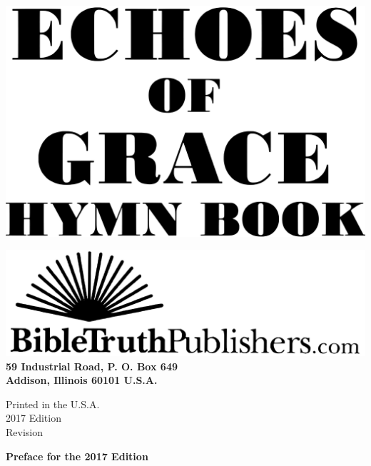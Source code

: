 \documentclass{book}
\begin{document}

\vspace*{1in}

\noindent\hfil\includegraphics[scale=0.06]{booklayout/bodoni-scan}\hfil

\vfill

\begin{center}
\includegraphics[scale=0.06]{booklayout/btp-scan}\\
\textbf{
\small{59 Industrial Road, P. O. Box 649\\
Addison, Illinois 60101 U.S.A.\\
}
}
\end{center}

\pagebreak

\vspace*{\fill}
\begin{center}
Printed in the U.S.A.\\
2017 Edition\\
Revision 
\end{center}

\pagebreak


\vspace*{1in}
\noindent\hfil{\textbf{Preface for the 2017 Edition}}\hfil
\end{document}
